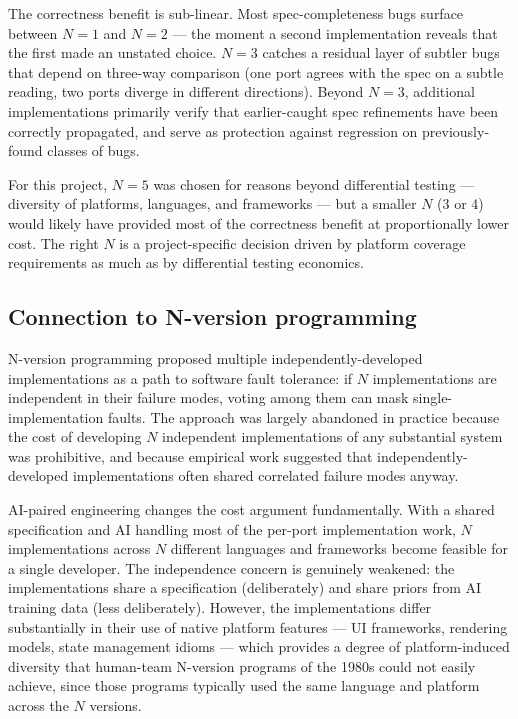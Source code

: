 \documentclass[10pt]{article}
\begin{document}
The correctness benefit is sub-linear. Most spec-completeness bugs surface
between $N=1$ and $N=2$ --- the moment a second implementation reveals
that the first made an unstated choice. $N=3$ catches a residual layer of
subtler bugs that depend on three-way comparison (one port agrees with
the spec on a subtle reading, two ports diverge in different directions).
Beyond $N=3$, additional implementations primarily verify that
earlier-caught spec refinements have been correctly propagated, and serve
as protection against regression on previously-found classes of bugs.

For this project, $N=5$ was chosen for reasons beyond differential testing
--- diversity of platforms, languages, and frameworks --- but a smaller
$N$ (3 or 4) would likely have provided most of the correctness benefit at
proportionally lower cost. The right $N$ is a project-specific decision
driven by platform coverage requirements as much as by differential
testing economics.

\subsection{Connection to N-version programming}
\label{sec:nversion}

N-version programming \citep{avizienis1985nversion} proposed multiple
independently-developed implementations as a path to software fault
tolerance: if $N$ implementations are independent in their failure modes,
voting among them can mask single-implementation faults. The approach was
largely abandoned in practice because the cost of developing $N$
independent implementations of any substantial system was prohibitive,
and because empirical work \citep{knight1986independence} suggested that
independently-developed implementations often shared correlated failure
modes anyway.

AI-paired engineering changes the cost argument fundamentally. With a
shared specification and AI handling most of the per-port implementation
work, $N$ implementations across $N$ different languages and frameworks
become feasible for a single developer. The independence concern is
genuinely weakened: the implementations share a specification
(deliberately) and share priors from AI training data (less deliberately).
However, the implementations differ substantially in their use of native
platform features --- UI frameworks, rendering models, state management
idioms --- which provides a degree of platform-induced diversity that
human-team N-version programs of the 1980s could not easily achieve,
since those programs typically used the same language and platform across
the $N$ versions.
\end{document}
